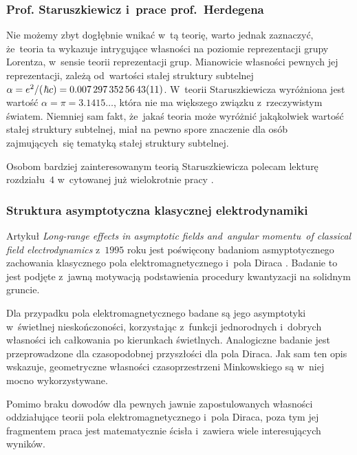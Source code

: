 \documentclass[10pt,t]{beamer}
\begin{document}
\begin{frame}
  \frametitle{Prof. Staruszkiewicz i~prace prof.~Herdegena}


  Nie możemy zbyt dogłębnie wnikać w~tą teorię, warto jednak zaznaczyć,
  że~teoria ta wykazuje intrygujące własności na poziomie reprezentacji
  grupy Lorentza, w~sensie teorii reprezentacji grup. Mianowicie własności
  pewnych jej reprezentacji, zależą od~wartości stałej struktury subtelnej
  $\alpha = e^{ 2 } / ( \hspace{0.09em} \hbar c ) =
  0.007 \, 297 \, 352 \, 56 \, 43(11)$. W~teorii Staruszkiewicza
  wyróżniona jest wartość $\alpha = \pi = 3.1415\ldots$, która nie ma większego związku
  z~rzeczywistym światem. Niemniej sam fakt, że~jakaś teoria może wyróżnić
  jakąkolwiek wartość stałej struktury subtelnej, miał na pewno spore
  znaczenie dla osób zajmujących~się tematyką stałej struktury subtelnej.

  Osobom bardziej zainteresowanym teorią Staruszkiewicza polecam lekturę
  rozdziału~$4$ w~cytowanej już wielokrotnie pracy
  \parencite{Herdegen-Infrared-structure-beyond-locality-ETC-Ver-2024}.

\end{frame}





\begin{frame}
  \frametitle{Struktura asymptotyczna klasycznej elektrodynamiki}


  Artykuł 
  {\textit{Long-range effects in asymptotic fields and~angular momentu~of
      classical field electrodynamics}} z~$1995$ roku jest poświęcony
  badaniom asmyptotycznego zachowania klasycznego pola elektromagnetycznego
  i~pola Diraca
  \parencite{Herdegen-Long-range-effects-in-asymptotic-ETC-Pub-1995}.
  Badanie to jest podjęte z~jawną motywacją podstawienia procedury
  kwantyzacji na solidnym gruncie.

  Dla przypadku pola elektromagnetycznego badane są jego asymptotyki
  w~świetlnej nieskończoności, korzystając z~funkcji jednorodnych i~dobrych
  własności ich całkowania po kierunkach świetlnych. Analogiczne badanie
  jest przeprowadzone dla czasopodobnej przyszłości dla pola Diraca. Jak
  sam ten opis wskazuje, geometryczne własności czasoprzestrzeni
  Minkowskiego są w~niej mocno wykorzystywane.

  Pomimo braku dowodów dla pewnych jawnie zapostulowanych własności
  oddziałujące teorii pola elektromagnetycznego i~pola Diraca, poza tym jej
  fragmentem praca jest matematycznie ścisła i~zawiera wiele interesujących
  wyników.

\end{frame}
\end{document}

